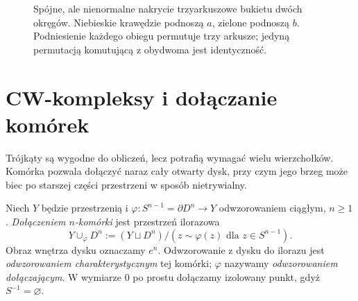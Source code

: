 \begin{figure}[!htbp]
\centering
{}
\caption{Spójne, ale nienormalne nakrycie trzyarkuszowe
bukietu dwóch okręgów. Niebieskie krawędzie podnoszą $a$,
zielone podnoszą $b$. Podniesienie każdego obiegu permutuje
trzy arkusze; jedyną permutacją komutującą z obydwoma
jest identyczność.}
\label{fig:nakrycie-nieregularne-bukiet-dg07}
\end{figure}

\section{CW-kompleksy i dołączanie komórek}
\label{sec:cw-kompleksy}

Trójkąty są wygodne do obliczeń, lecz
potrafią wymagać wielu wierzchołków.
Komórka pozwala dołączyć naraz cały
otwarty dysk, przy czym jego brzeg
może biec po starszej części przestrzeni
w sposób nietrywialny.

\begin{definicja}
\label{def:dolaczenie-komorki}
Niech $Y$ będzie przestrzenią i
$\varphi:S^{n-1}=\partial D^n\to Y$
odwzorowaniem ciągłym, $n\geq1$.
\emph{Dołączeniem $n$-komórki} jest
przestrzeń ilorazowa
\[
 Y\cup_\varphi D^n
 :=(Y\sqcup D^n)/(z\sim\varphi(z)
 \text{ dla }z\in S^{n-1}).
\]
Obraz wnętrza dysku oznaczamy $e^n$.
Odwzorowanie z dysku do ilorazu jest
\emph{odwzorowaniem charakterystycznym}
tej komórki; $\varphi$ nazywamy
\emph{odwzorowaniem dołączającym}.
W wymiarze $0$ po prostu dołączamy
izolowany punkt, gdyż
$S^{-1}=\varnothing$.
\end{definicja}

